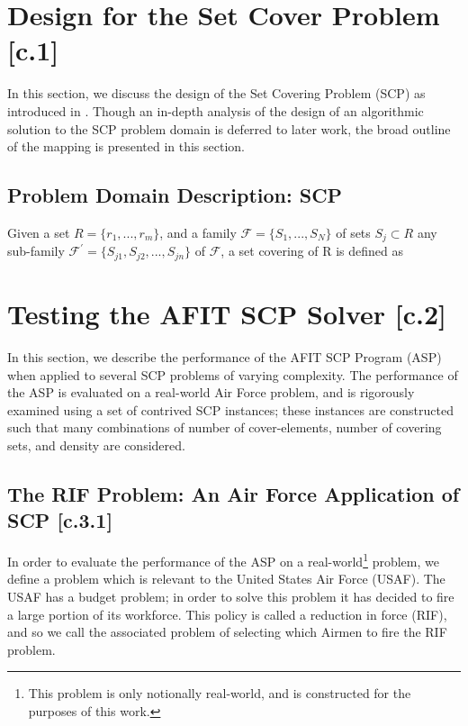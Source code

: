 \documentclass[12pt]{article}
\begin{document}
\section{Design for the Set Cover Problem [c.1]} \label{scn:design}

In this section, we discuss the design of the Set Covering Problem (SCP) as introduced in \cite{ClassNotes686}. Though an in-depth analysis of the design of an algorithmic solution to the SCP problem domain is deferred to later work, the broad outline of the mapping is presented in this section.

\subsection{Problem Domain Description: SCP}
Given a set $R=\{r_1,...,r_m\}$, and a family $\mathcal{F}=\{S_1,...,S_N\}$ of sets $S_j \subset R$ any sub-family $\mathcal{F^\prime}=\{S_{j1}, S_{j2},...,S_{jn}\}$ of $\mathcal{F}$, a set covering of R is defined as


\section{Testing the AFIT SCP Solver [c.2]} \label{scn:testing}

In this section, we describe the performance of the AFIT SCP Program (ASP) when applied to several SCP problems of varying complexity. The performance of the ASP is evaluated on a real-world Air Force problem, and is rigorously examined using a set of contrived SCP instances; these instances are constructed such that many combinations of number of cover-elements, number of covering sets, and density are considered. 

\subsection{The RIF Problem: An Air Force Application of SCP [c.3.1]} \label{scn:testing_usaf}

In order to evaluate the performance of the ASP on a real-world\footnote{This problem is only notionally real-world, and is constructed for the purposes of this work.} problem, we define a problem which is relevant to the United States Air Force (USAF). The USAF has a budget problem; in order to solve this problem it has decided to fire a large portion of its workforce. This policy is called a reduction in force (RIF), and so we call the associated problem of selecting which Airmen to fire the RIF problem.
\end{document}
